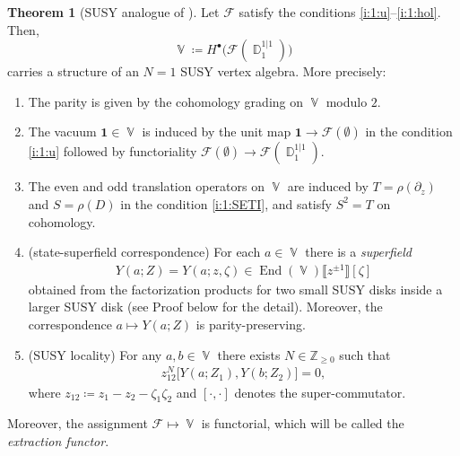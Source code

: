 \documentclass[final,reqno]{amsart}
\numberwithin{equation}{section}
\theoremstyle{definition}
\newtheorem{thm}{Theorem}[section]
\newcommand{\bl}{\bullet}
\newcommand{\ceq}{\coloneqq} %
\newcommand{\mto}{\mapsto}
\newcommand{\bbZ}{\mathbb{Z}}
\newcommand{\clF}{\mathcal{F}}
\newcommand{\pd}{\partial}
\newcommand{\dbr}[1]{\llbracket #1 \rrbracket} %
\DeclareMathOperator{\bbD}{\mathbb{D}}
\DeclareMathOperator{\bbV}{\mathbb{V}}
\DeclareMathOperator{\End}{End}
\begin{document}
\begin{thm}[{SUSY analogue of \cite[Theorem 5.3.3]{CG1}}]
\label{thm:1:533}
Let $\clF$ satisfy the conditions \ref{i:1:u}--\ref{i:1:hol}.
Then, 
\[
 \bbV \ceq H^{\bl}\!\bigl(\clF(\bbD_1^{1|1})\bigr)
\]
carries a structure of an $N=1$ SUSY vertex algebra.
More precisely:
\begin{enumerate}
\item \label{i:thm:1:533:parity}
The parity is given by the cohomology grading on $\bbV$ modulo $2$.

\item 
The vacuum $\bm{1}\in \bbV$ is induced by 
the unit map $\bm{1}\to \clF(\emptyset)$ in the condition \ref{i:1:u} 
followed by functoriality $\clF(\emptyset)\to \clF(\bbD_1^{1|1})$.

\item 
The even and odd translation operators on $\bbV$ are induced by 
$T=\rho(\pd_z)$ and $S=\rho(D)$ in the condition \ref{i:1:SETI}, 
and satisfy $S^2=T$ on cohomology.

\item (state-superfield correspondence) 
For each $a\in\bbV$ there is a \emph{superfield} 
\begin{align}\label{eq:1:YaZ}
 Y(a;Z) = Y(a;z,\zeta) \in \End(\bbV)\dbr{z^{\pm1}}[\zeta]
\end{align}
obtained from the factorization products for two small SUSY disks 
inside a larger SUSY disk (see Proof below for the detail).
Moreover, the correspondence $a \mto Y(a;Z)$ is parity-preserving.

\item (SUSY locality) 
For any $a,b\in\bbV$ there exists $N \in \bbZ_{\ge0}$ such that
\begin{align}\label{eq:1:Sloc}
  z_{12}^N \bigl[Y(a;Z_1),Y(b;Z_2)\bigr] = 0,
\end{align}
where $z_{12} \ceq z_1-z_2-\zeta_1\zeta_2$ and 
$[\cdot,\cdot]$ denotes the super-commutator.
\end{enumerate}
Moreover, the assignment $\clF \mto \bbV$ is functorial,
which will be called the \emph{extraction functor}. 
\end{thm}
\end{document}
